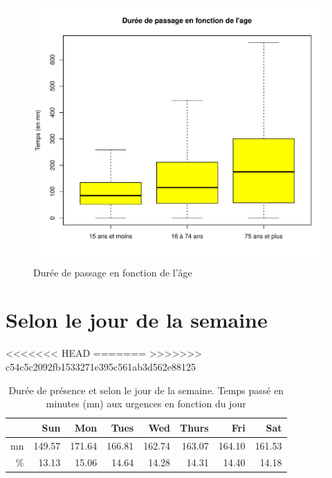 \documentclass[12pt,english,french,twoside]{book}\usepackage[]{graphicx}\usepackage[]{color}
\makeatletter
\def\maxwidth{ %
  \ifdim\Gin@nat@width>\linewidth
    \linewidth
  \else
    \Gin@nat@width
  \fi
}
\newenvironment{knitrout}{}{} %
\makeatother
\begin{document}
\begin{figure}[ht!]
 \centering
\begin{knitrout}
\color{fgcolor}
\includegraphics[width=\maxwidth]{figure/age_groupe2} 

\end{knitrout}

 \caption{Durée de passage en fonction de l'âge}
 \label{fig:bp_age}
\end{figure}


\section{Selon le jour de la semaine}

<<<<<<< HEAD
=======
>>>>>>> c54c5c2092fb1533271e395c561ab3d562e88125
\begin{table}[ht]
\centering
\begin{tabular}{rrrrrrrr}
  \hline
 & Sun & Mon & Tues & Wed & Thurs & Fri & Sat \\ 
  \hline
mn & 149.57 & 171.64 & 166.81 & 162.74 & 163.07 & 164.10 & 161.53 \\ 
  \% & 13.13 & 15.06 & 14.64 & 14.28 & 14.31 & 14.40 & 14.18 \\ 
   \hline
\end{tabular}
\caption[Durée de présence et jour de la semaine]{Durée de présence et selon le jour de la semaine. Temps passé en minutes (mn) aux urgences en fonction du jour} 
\label{tab:jour_semaine}
\end{table}
\end{document}
